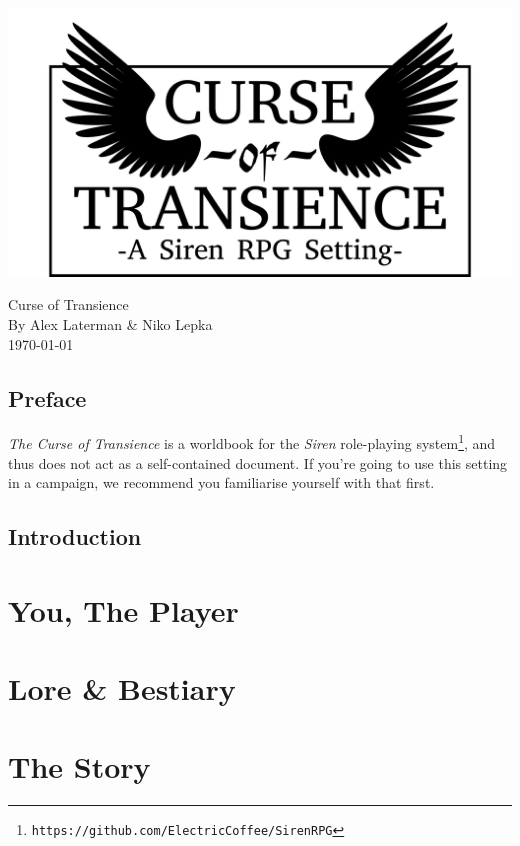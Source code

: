 \documentclass[a4paper]{book}
\begin{document}
\begin{titlepage}
    \begin{center}
        \includegraphics[width = \textwidth]{graphics/logo-winged.png}
    \end{center}
\end{titlepage}
\thispagestyle{empty}
\frontmatter
\begin{center}
    \Huge{Curse of Transience}\\
    \Large{By Alex Laterman \& Niko Lepka}\\
    \large{\today}
\end{center}

\chapter*{Preface}
\textit{The Curse of Transience} is a worldbook for the \textit{Siren} role-playing system\footnote{\texttt{https://github.com/ElectricCoffee/SirenRPG}}, and thus does not act as a self-contained document.
If you're going to use this setting in a campaign, we recommend you familiarise yourself with that first.

\chapter*{Introduction}

\tableofcontents
\mainmatter
\part{You, The Player}








\part{Lore \& Bestiary}



\part{The Story}
\end{document}
